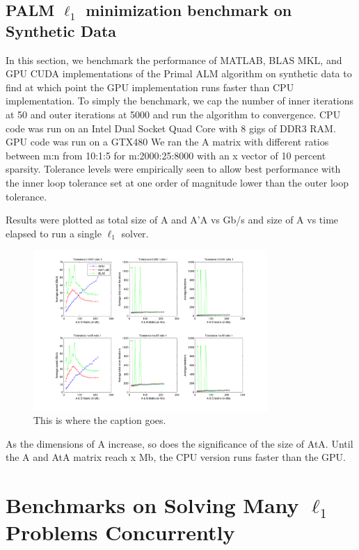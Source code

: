 \documentclass[10pt,twocolumn,letterpaper]{article}
\begin{document}
\subsection{PALM $\ell_1$ minimization benchmark on Synthetic Data}

In this section, we benchmark the performance of MATLAB, BLAS MKL, and GPU CUDA
implementations of the Primal ALM algorithm on synthetic data to find at which
point the GPU implementation runs faster than CPU implementation.  To simply
the benchmark, we cap the number of inner iterations at 50 and outer iterations
at 5000 and run the algorithm to convergence.  CPU code was run on an Intel
Dual Socket Quad Core with 8 gigs of DDR3 RAM.  GPU code was run on a GTX480 We
ran the A matrix with different ratios between m:n from 10:1:5 for
m:2000:25:8000 with an x vector of 10 percent sparsity.  Tolerance levels were
empirically seen to allow best performance with the inner loop tolerance set at
one order of magnitude lower than the outer loop tolerance.

Results were plotted as total size of A and A'A vs Gb/s and size of A vs time
elapsed to run a single $\ell_1$ solver.

\begin{figure}
\centering
\includegraphics[width=3.5in]{figures/PALM_benchmark_ratio_1.png}
\caption{This is where the caption goes.}
\label{fig:uniqueidentifierforthisimage}
\end{figure}


As the dimensions of A increase, so does the significance of the size of AtA.  Until the A and AtA matrix reach x Mb, the CPU version runs faster than the GPU.  

\section{Benchmarks on Solving Many $\ell_1$ Problems Concurrently}
\end{document}
